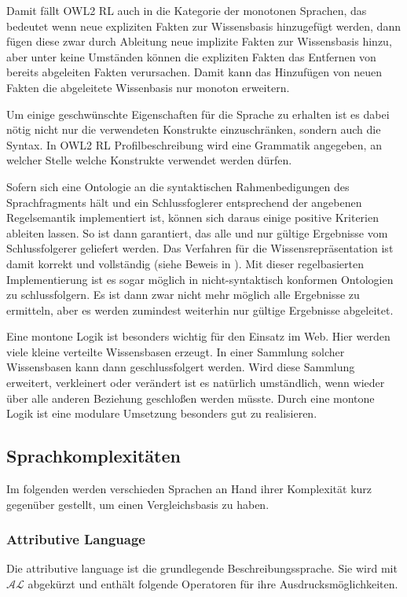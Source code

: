 Damit fällt OWL2 RL auch in die Kategorie der monotonen Sprachen, das bedeutet wenn neue expliziten Fakten zur Wissensbasis hinzugefügt werden, dann fügen diese zwar durch Ableitung neue implizite Fakten zur Wissensbasis hinzu, aber unter keine Umständen können die expliziten Fakten das Entfernen von bereits abgeleiten Fakten verursachen. Damit kann das Hinzufügen von neuen Fakten die abgeleitete Wissenbasis nur monoton erweitern.

Um einige geschwünschte Eigenschaften für die Sprache zu erhalten ist es dabei nötig nicht nur die verwendeten Konstrukte einzuschränken, sondern auch die Syntax. In OWL2 RL Profilbeschreibung wird eine Grammatik angegeben, an welcher Stelle welche Konstrukte verwendet werden dürfen.

Sofern sich eine Ontologie an die syntaktischen Rahmenbedigungen des Sprachfragments hält und ein Schlussfoglerer entsprechend der angebenen Regelsemantik implementiert ist, können sich daraus einige positive Kriterien ableiten lassen. So ist dann garantiert, das alle und nur gültige Ergebnisse vom Schlussfolgerer geliefert werden. Das Verfahren für die Wissensrepräsentation ist damit korrekt und vollständig (siehe Beweis in \cite{OWL2Profiles}).
Mit dieser regelbasierten Implementierung ist es sogar möglich in nicht-syntaktisch konformen Ontologien zu schlussfolgern. Es ist dann zwar nicht mehr möglich alle Ergebnisse zu ermitteln, aber es werden zumindest weiterhin nur gültige Ergebnisse abgeleitet.

Eine montone Logik ist besonders wichtig für den Einsatz im Web. Hier werden viele kleine verteilte Wissensbasen erzeugt. In einer Sammlung solcher Wissensbasen kann dann geschlussfolgert werden. Wird diese Sammlung erweitert, verkleinert oder verändert ist es natürlich umständlich, wenn wieder über alle anderen Beziehung geschloßen werden müsste. Durch eine montone Logik ist eine modulare Umsetzung besonders gut zu realisieren.

\subsection{Sprachkomplexitäten}
Im folgenden werden verschieden Sprachen an Hand ihrer Komplexität kurz gegenüber gestellt, um einen Vergleichsbasis zu haben.

\subsubsection{Attributive Language}
Die attributive language ist die grundlegende Beschreibungssprache. Sie wird mit $\mathcal{AL}$ abgekürzt und enthält folgende Operatoren für ihre Ausdrucksmöglichkeiten.

